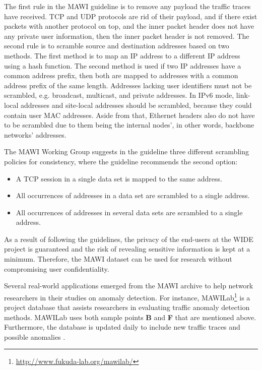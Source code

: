 \documentclass[sigconf,authorversion,nonacm]{acmart}
\begin{document}
The first rule in the MAWI guideline is to remove any payload the traffic traces have received. TCP and UDP protocols are rid of their payload, and if there exist packets with another protocol on top, and the inner packet header does not have any private user information, then the inner packet header is not removed. The second rule is to scramble source and destination addresses based on two methods. The first method is to map an IP address to a different IP address using a hash function. The second method is used if two IP addresses have a common address prefix, then both are mapped to addresses with a common address prefix of the same length. Addresses lacking user identifiers must not be scrambled, e.g. broadcast, multicast, and private addresses. In IPv6 mode, link-local addresses and site-local addresses should be scrambled, because they could contain user MAC addresses. Aside from that, Ethernet headers also do not have to be scrambled due to them being the internal nodes', in other words, backbone networks' addresses.

The MAWI Working Group suggests in the guideline three different scrambling policies for consistency, where the guideline recommends the second option:
\begin{itemize}
    \item A TCP session in a single data set is mapped to the same address. 
    \item All occurrences of addresses in a data set are scrambled to a single address.
    \item All occurrences of addresses in several data sets are scrambled to a single address.
\end{itemize}

As a result of following the guidelines, the privacy of the end-users at the WIDE project is guaranteed and the risk of revealing sensitive information is kept at a minimum. Therefore, the MAWI dataset can be used for research without compromising user confidentiality.

Several real-world applications emerged from the MAWI archive to help network researchers in their studies on anomaly detection. For instance, MAWILab\footnote{\url{http://www.fukuda-lab.org/mawilab/}} is a project database that assists researchers in evaluating traffic anomaly detection methods. MAWILab uses both sample points \textbf{B} and \textbf{F} that are mentioned above. Furthermore, the database is updated daily to include new traffic traces and possible anomalies \cite{mawilab}. 
\end{document}
